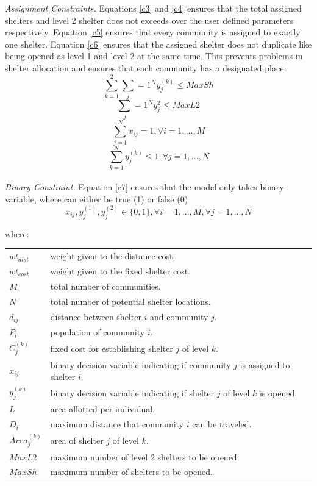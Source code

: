 	\textit{Assignment Constraints.} Equations \ref{c3} and \ref{c4} ensures that the total assigned shelters and level 2 shelter does not exceeds over the user defined parameters respectively.  Equation \ref{c5} ensures that every community is assigned to exactly one shelter. Equation \ref{c6} ensures that the assigned shelter does not duplicate like being opened as level 1 and level 2 at the same time. This prevents problems in shelter allocation and ensures that each community has a designated place.
	\begin{equation} 
		\label{c3}
		\sum_{k=1}^{2} \sum_j={1}^{N}y_{j}^{(k)} \le MaxSh
	\end{equation}
	\begin{equation}
		\label{c4} 
		\sum_j={1}^{N}y_{j}^2 \le MaxL2
	\end{equation}
	\begin{equation}
		\label{c5}
		\sum_{j=1}^{N}x_{ij} = 1, \forall i=1,...,M
	\end{equation}
	\begin{equation}
		\label{c6}
		\sum_{k=1}^{N}y_{j}^{(k)} \le 1, \forall j=1,...,N
	\end{equation}\\
	
	
	\textit{Binary Constraint.} Equation \ref{c7} ensures that the model only takes binary variable, where can either be true (1) or false (0)
	\begin{equation}
		\label{c7}
	 	x_{ij}, y_{j}^{(1)},y_{j}^{(2)} \in \{0,1\}, \forall i=1,...,M,  \forall j=1,...,N
	\end{equation}
	
	\noindent where: \\
	\begin{tabular}{@{}ll}
	$wt_{dist}$ & weight given to the distance cost. \\
	$wt_{cost}$ & weight given to the fixed shelter cost. \\
	$M$ & total number of communities. \\
	$N$ & total number of potential shelter locations. \\
	$d_{ij}$ & distance between shelter $i$ and community $j$. \\
	$P_{i}$ & population of community $i$. \\
	$C_{j}^{(k)}$ & fixed cost for establishing shelter $j$ of level $k$. \\
	$x_{ij}$ & binary decision variable indicating if community $j$ is assigned to shelter $i$. \\
	$y_{j}^{(k)}$ & binary decision variable indicating if shelter $j$ of level $k$ is opened. \\
	$L$ & area allotted per individual. \\
	$D_{i}$ & maximum distance that community $i$ can be traveled. \\
	$Area_{j}^{(k)}$ & area of shelter $j$ of level $k$. \\
	$MaxL2$ & maximum number of level 2 shelters to be opened. \\
	$MaxSh$ & maximum number of shelters to be opened. \\
	\end{tabular}
	
